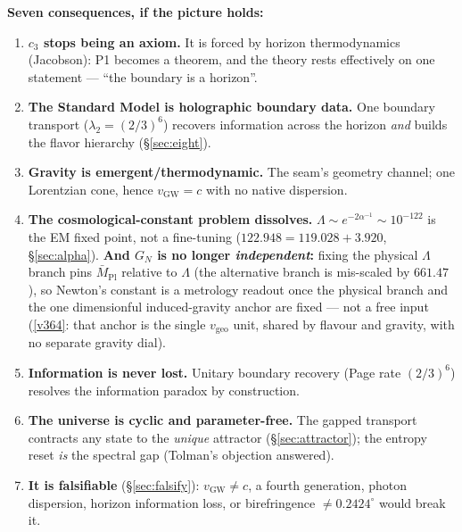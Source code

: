 \documentclass[11pt,a4paper]{article}
\newcommand{\cthree}{c_3}
\newcommand{\ainv}{\alpha^{-1}}
\begin{document}
\noindent\textbf{Seven consequences, if the picture holds:}
\begin{enumerate}[leftmargin=1.7em]
\item \textbf{$\cthree$ stops being an axiom.} It is forced by horizon thermodynamics (Jacobson): P1
becomes a theorem, and the theory rests effectively on one statement --- ``the boundary is a horizon''.
\item \textbf{The Standard Model is holographic boundary data.} One boundary transport ($\lambda_2=(2/3)^6$)
recovers information across the horizon \emph{and} builds the flavor hierarchy (\S\ref{sec:eight}).
\item \textbf{Gravity is emergent/thermodynamic.} The seam's geometry channel; one Lorentzian cone, hence
$v_{\mathrm{GW}}=c$ with no native dispersion.
\item \textbf{The cosmological-constant problem dissolves.} $\Lambda\sim e^{-2\ainv}\sim10^{-122}$ is the EM
fixed point, not a fine-tuning ($122.948=119.028+3.920$, \S\ref{sec:alpha}). \textbf{And $G_N$ is no longer
\emph{independent}:} fixing the physical $\Lambda$ branch pins $\bar M_{\mathrm{Pl}}$ relative to $\Lambda$
(the alternative branch is mis-scaled by $661.47$), so Newton's constant is a metrology readout once the
physical branch and the one dimensionful induced-gravity anchor are fixed --- not a free input
(\vref{v364}: that anchor is the single $v_{\mathrm{geo}}$ unit, shared by flavour and gravity, with no
separate gravity dial).
\item \textbf{Information is never lost.} Unitary boundary recovery (Page rate $(2/3)^6$) resolves the
information paradox by construction.
\item \textbf{The universe is cyclic and parameter-free.} The gapped transport contracts any state to the
\emph{unique} attractor (\S\ref{sec:attractor}); the entropy reset \emph{is} the spectral gap (Tolman's
objection answered).
\item \textbf{It is falsifiable} (\S\ref{sec:falsify}): $v_{\mathrm{GW}}\neq c$, a fourth generation,
photon dispersion, horizon information loss, or birefringence $\neq0.2424^\circ$ would break it.
\end{enumerate}
\end{document}
